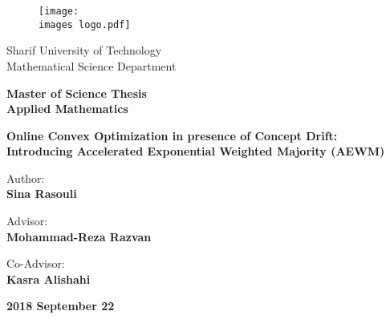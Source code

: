 \documentclass[a4paper,11px]{article}
\begin{document}
\thispagestyle{empty}
\begin{latin}

\begin{figure}[!hbt]
\centering
\texttt{[image: \\images logo.pdf]}
\centering
\end{figure}

\vspace{-5mm}
\begin{center}
\large
Sharif University of Technology\\
Mathematical Science Department
\end{center}

\vspace{5mm}
\begin{center}
\large
\textbf{
Master of Science Thesis\\
Applied Mathematics
}
\end{center}


\vspace{5mm}
\begin{center}
\Large
\textbf{
Online Convex Optimization in presence of Concept Drift:\\
Introducing Accelerated Exponential Weighted Majority (AEWM)
}
\end{center}


\vspace{10mm}
\begin{center}
\large
Author:
\\
\textbf{
Sina Rasouli
}
\end{center}



\vspace{10mm}
\begin{center}
\large
Advisor:
\\
\textbf{
Mohammad-Reza Razvan
}
\end{center}

\vspace{2mm}

\begin{center}
\large
Co-Advisor:
\\
\textbf{
Kasra Alishahi
}
\end{center}



\vfill
\begin{center}
\large \textbf{
2018 September 22
}
\end{center}

\end{latin}


\newpage
\end{document}
